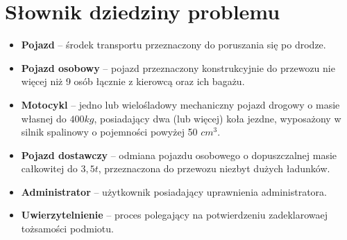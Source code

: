 \chapter{Słownik dziedziny problemu}
\begin{itemize}
    \item \textbf{Pojazd} -- środek transportu przeznaczony do poruszania się po drodze.
    \item \textbf{Pojazd osobowy} -- pojazd przeznaczony konstrukcyjnie do przewozu nie więcej niż 9 osób łącznie z kierowcą oraz
    ich bagażu.
    \item \textbf{Motocykl} --  jedno lub wielośladowy mechaniczny pojazd drogowy o masie własnej do $400 kg$, posiadający dwa
    (lub więcej) koła jezdne, wyposażony w silnik spalinowy o pojemności powyżej 50 $cm^3$.
    \item \textbf{Pojazd dostawczy} -- odmiana pojazdu osobowego o dopuszczalnej masie całkowitej do $3,5t$, przeznaczona
    do przewozu niezbyt dużych ładunków.
    \item \textbf{Administrator} -- użytkownik posiadający uprawnienia administratora.
    \item \textbf{Uwierzytelnienie} -- proces polegający na potwierdzeniu zadeklarowaej tożsamości podmiotu.
\end{itemize}